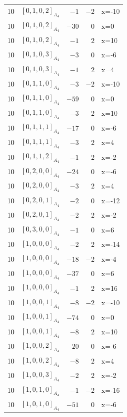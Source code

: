 \documentclass[11pt]{article}
\newcommand{\Dynkin}[1]{#1}
\begin{document}
\begin{longtable}{r l r r l}
10 & $\Dynkin{[0,1,0,2]_{A_4}}$ & $-1$ & $-2$ & x=-10\\
10 & $\Dynkin{[0,1,0,2]_{A_4}}$ & $-30$ & $0$ & x=0\\
10 & $\Dynkin{[0,1,0,2]_{A_4}}$ & $-1$ & $2$ & x=10\\
10 & $\Dynkin{[0,1,0,3]_{A_4}}$ & $-3$ & $0$ & x=-6\\
10 & $\Dynkin{[0,1,0,3]_{A_4}}$ & $-1$ & $2$ & x=4\\
10 & $\Dynkin{[0,1,1,0]_{A_4}}$ & $-3$ & $-2$ & x=-10\\
10 & $\Dynkin{[0,1,1,0]_{A_4}}$ & $-59$ & $0$ & x=0\\
10 & $\Dynkin{[0,1,1,0]_{A_4}}$ & $-3$ & $2$ & x=10\\
10 & $\Dynkin{[0,1,1,1]_{A_4}}$ & $-17$ & $0$ & x=-6\\
10 & $\Dynkin{[0,1,1,1]_{A_4}}$ & $-3$ & $2$ & x=4\\
10 & $\Dynkin{[0,1,1,2]_{A_4}}$ & $-1$ & $2$ & x=-2\\
10 & $\Dynkin{[0,2,0,0]_{A_4}}$ & $-24$ & $0$ & x=-6\\
10 & $\Dynkin{[0,2,0,0]_{A_4}}$ & $-3$ & $2$ & x=4\\
10 & $\Dynkin{[0,2,0,1]_{A_4}}$ & $-2$ & $0$ & x=-12\\
10 & $\Dynkin{[0,2,0,1]_{A_4}}$ & $-2$ & $2$ & x=-2\\
10 & $\Dynkin{[0,3,0,0]_{A_4}}$ & $-1$ & $0$ & x=6\\
10 & $\Dynkin{[1,0,0,0]_{A_4}}$ & $-2$ & $2$ & x=-14\\
10 & $\Dynkin{[1,0,0,0]_{A_4}}$ & $-18$ & $-2$ & x=-4\\
10 & $\Dynkin{[1,0,0,0]_{A_4}}$ & $-37$ & $0$ & x=6\\
10 & $\Dynkin{[1,0,0,0]_{A_4}}$ & $-1$ & $2$ & x=16\\
10 & $\Dynkin{[1,0,0,1]_{A_4}}$ & $-8$ & $-2$ & x=-10\\
10 & $\Dynkin{[1,0,0,1]_{A_4}}$ & $-74$ & $0$ & x=0\\
10 & $\Dynkin{[1,0,0,1]_{A_4}}$ & $-8$ & $2$ & x=10\\
10 & $\Dynkin{[1,0,0,2]_{A_4}}$ & $-20$ & $0$ & x=-6\\
10 & $\Dynkin{[1,0,0,2]_{A_4}}$ & $-8$ & $2$ & x=4\\
10 & $\Dynkin{[1,0,0,3]_{A_4}}$ & $-2$ & $2$ & x=-2\\
10 & $\Dynkin{[1,0,1,0]_{A_4}}$ & $-1$ & $-2$ & x=-16\\
10 & $\Dynkin{[1,0,1,0]_{A_4}}$ & $-51$ & $0$ & x=-6\\

\end{longtable}
\end{document}
